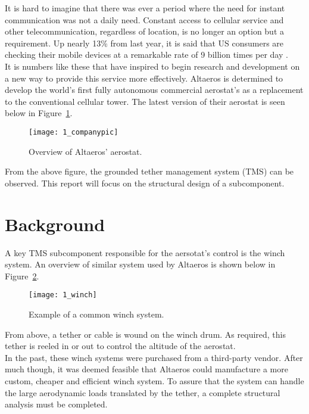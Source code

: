\label{chapt:intro}

It is hard to imagine that there was ever a period where the need for instant communication was not a daily need. Constant access to cellular service and other telecommunication, regardless of location, is no longer an option but a requirement. Up nearly 13\% from last year, it is said that US consumers are checking their mobile devices at a remarkable rate of 9 billion times per day \cite{deloittestat}.\\

It is numbers like these that have inspired \Company to begin research and development on a new way to provide this service more effectively. Altaeros is determined to develop the world's first fully autonomous commercial aerostat's as a replacement to the conventional cellular tower. The latest version of their aerostat is seen below in Figure~\ref{fig:1_companypic}.

\begin{figure}[H]
	\centering
	\texttt{[image: 1\_companypic]}
	\caption[Overview of Altaeros' aerostat.]{Overview of Altaeros' aerostat.\protect\cite{companypicweb}}
	\label{fig:1_companypic}
\end{figure}

From the above figure, the grounded tether management system (TMS) can be observed. This report will focus on the structural design of a subcomponent.

\section{Background} 

A key TMS subcomponent responsible for the aersotat's control is the winch system. An overview of similar system used by Altaeros is shown below in Figure~\ref{fig:1_winch}.
\begin{figure}[H]
	\centering
	\texttt{[image: 1\_winch]}
	\caption[Example of a common winch system.]{Example of a common winch system.\protect\cite{winchpic}}
	\label{fig:1_winch}
\end{figure}

From above, a tether or cable is wound on the winch drum. As required, this tether is reeled in or out to control the altitude of the aerostat.\\

In the past, these winch systems were purchased from a third-party vendor. After much though, it was deemed feasible that Altaeros could manufacture a more custom, cheaper and efficient winch system. To assure that the system can handle the large aerodynamic loads translated by the tether, a complete structural analysis must be completed.

